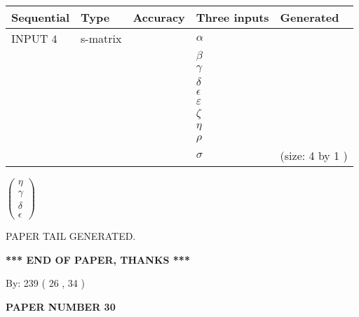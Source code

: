 \documentclass[12pt]{article}
\begin{document}
  
\noindent\begin{tabular}{|l|l|l|l|l|}
\hline
 Sequential & Type & Accuracy & Three inputs & Generated \\ 
\hline
 
 
  INPUT $            4 $ & s-matrix & & 
 $  \alpha $ & 
  \\
  & & & 
 $  \beta $ & 
  \\
  & & & 
 $  \gamma $ & 
  \\
  & & & 
 $  \delta $ & 
  \\
  & & & 
 $  \epsilon $ & 
  \\
  & & & 
 $  \varepsilon $ & 
  \\
  & & & 
 $                     \zeta $ & 
  \\
  & & & 
 $  \eta $ & 
  \\
  & & & 
 $  \rho $ & 
  \\
  & & & 
 $  \sigma $ & 
  (size:            4  by            1 )
 \\  \hline  
 \end{tabular}
   
   
 $  \left( \begin{array}
 {
 c
 }
 \eta \\ 
 \gamma \\ 
 \delta \\ 
 \epsilon
 \end{array} \right) $ 
   
   
   
   
 \vspace{0.2in}
 
   
   
\vspace{2.0in} PAPER TAIL GENERATED.
   
   
   
   
\vspace{1.0in} 
{\textbf{\large{ *** END OF PAPER, THANKS *** }}} 
   
   
\hspace{1.0in} By: 
         239 (          26 ,           34 )
   
   
   
   
\newpage 
\setcounter{page}{ 
    30001 } 
   
   
   
   
 {\textbf{ \Large{ PAPER NUMBER           30  }}}
   
   
\vspace{0.2in}
   
\end{document}
